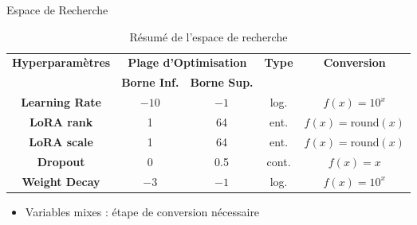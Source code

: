 \begin{frame}{Espace de Recherche}

    \begin{table}[h]
        \centering
        \begin{tabular}{|c|c|c|c|c|}
            \hline
            \multirow{2}{*}{\textbf{ Hyperparamètres }} & \multicolumn{2}{|c|}{\textbf{Plage d'Optimisation}} &\multirow{2}{*}{\textbf{ Type }}& \multirow{2}{*}{\textbf{ Conversion }} \\
            \cline{2-3}
             & \textbf{ Borne Inf. } & \textbf{ Borne Sup. } & & \\
            \hline
            \textbf{Learning Rate} & $-10$ & $-1$ & log. & $f(x) = 10^{x}$ \\
            \hline
            \textbf{LoRA rank} & 1 & 64 &ent. &$f(x) = \text{round}(x)$ \\
            \hline
            \textbf{LoRA scale} &1 & 64 & ent. &$f(x) = \text{round}(x)$ \\
            \hline
            \textbf{Dropout} & 0 & 0.5 & cont.& $f(x) = x$ \\
            \hline
            \textbf{Weight Decay} & $-3$ & $-1$ &log.& $f(x) = 10^{x}$  \\
            \hline
        \end{tabular}
        \caption{Résumé de l'espace de recherche}
    \end{table}

    \begin{itemize}
        \item Variables mixes : étape de conversion nécessaire
    \end{itemize}

\end{frame}

